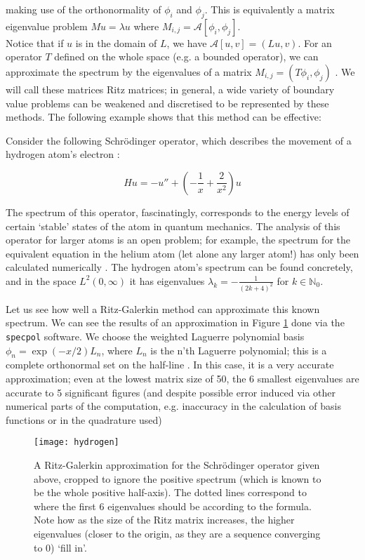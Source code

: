 \documentclass[../main.tex]{subfiles}
\begin{document}
making use of the orthonormality of $\phi_i$ and $\phi_j$. This is equivalently a matrix eigenvalue problem $M u = \lambda u$ where $M_{i,j} = \mathcal{A}[\phi_i, \phi_j]$.\\

Notice that if $u$ is in the domain of $L$, we have $\mathcal{A}[u, v] = (Lu, v)$. For an operator $T$ defined on the whole space (e.g. a bounded operator), we can approximate the spectrum by the eigenvalues of a matrix $M_{i, j} = (T \phi_i, \phi_j)$ \cite{davies2003spectral}. We will call these matrices Ritz matrices;  in general, a wide variety of boundary value problems can be weakened and discretised to be represented
by these methods. The following example shows that this method can be effective:

\begin{example}\label{ex:schrodinger-ritz}
Consider the following Schr\"odinger operator, which describes the movement of a hydrogen atom's electron \cite{pryce1993numerical}:

$$Hu = -u'' + (-\frac{1}{x} + \frac{2}{x^2})u$$
\end{example}

The spectrum of this operator, fascinatingly, corresponds to the energy levels of certain `stable' states of the atom in quantum mechanics. 
The analysis of this operator for larger atoms is an open problem; for example,
the spectrum for the equivalent equation in the helium atom (let alone any larger atom!) has only been calculated numerically \cite{davies1995spectral}. The hydrogen atom's
spectrum can be found concretely, and in the space $L^2(0, \infty)$ it has eigenvalues $\lambda_k = -\frac{1}{(2k + 4)^2}$ for $k \in \mathbb{N}_0$.

Let us see how well a Ritz-Galerkin method can approximate this known spectrum. We can see the results of an approximation in Figure \ref{fig:schrodinger-ritz} done via the \texttt{specpol} software. We choose the weighted Laguerre polynomial basis $\phi_n = \exp(-x/2)L_n$, where $L_n$ is the n'th Laguerre polynomial; this is a complete orthonormal set on the half-line \cite{szego1975orthogonal}.
 In this case, it is a very accurate approximation; even at the lowest matrix size of 50, the 6 smallest eigenvalues are accurate to 5 significant figures (and despite possible error induced via other numerical parts of the computation, e.g. inaccuracy in the calculation of basis functions or in the quadrature used)

\begin{figure}[p!]
\texttt{[image: hydrogen]}
\caption{A Ritz-Galerkin approximation for the Schr\"odinger operator given above, cropped to ignore the positive spectrum (which is known to be the whole positive half-axis). The dotted lines correspond to where the first 6 eigenvalues should be according to the formula.
Note how as the size of the Ritz matrix increases, the higher eigenvalues (closer to the origin, as they are a sequence converging to 0) `fill in'.}\label{fig:schrodinger-ritz}
\end{figure}
\clearpage
\end{document}

